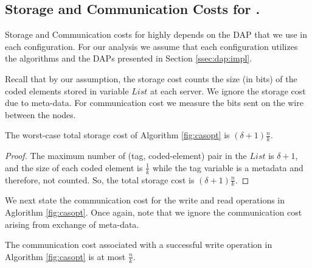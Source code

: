 %


\subsection{Storage and Communication Costs for \ares{}.}\label{sec:safety:c}
Storage and Communication costs for \ares{} highly depends on the DAP that we use 
in each configuration. For our analysis we assume that each configuration utilizes the 
algorithms and the DAPs presented in Section \ref{ssec:dap:impl}.

Recall that by our assumption, the storage cost counts the size (in bits) of the coded elements 
stored in variable $List$  at each server. We ignore the storage cost due to meta-data.
For  communication cost we measure the bits sent on the wire between the nodes.

\begin{lemma}\label {thm:storage_TREAS}
	The worst-case total storage cost of Algorithm \ref{fig:casopt} is $(\delta +1 )\frac{n}{k}$.
\end{lemma}
\begin{proof}
  The maximum number of  (tag, coded-element) pair in the $List$ is $\delta+1$, and the size of each coded element is 
  $\frac{1}{k}$ while the tag variable is a metadata and therefore, not counted. So, the total storage cost is $(\delta +1)\frac{n}{k}$.
\end{proof}

We next state  the communication cost for the write and read operations in  Aglorithm \ref{fig:casopt}. Once again, note that we ignore the communication cost arising from exchange of meta-data.

\begin{lemma} \label{treas:write_cost}
	The communication cost associated with a successful  write operation in Algorithm \ref{fig:casopt} is at most $\frac{n}{k}$. 
\end{lemma}

